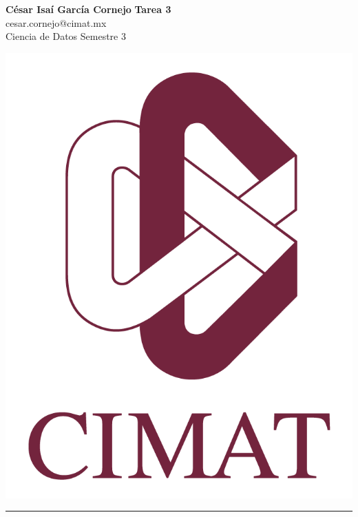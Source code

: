 \documentclass[a4paper, 11pt]{article}
\begin{document}
	\noindent
	
	\begin{minipage}[b][1.2cm][t]{0.8\textwidth}
		\large\textbf{César Isaí García Cornejo} \hfill \textbf{Tarea 3}  \\
		cesar.cornejo@cimat.mx \hfill \\
		\normalsize Ciencia de Datos \hfill Semestre 3\\
	\end{minipage}
	
	\hspace{14.4cm}
	\begin{minipage}[b][0.03cm][t]{0.12\linewidth}
		
		\vspace{-2.2cm}
		\includegraphics[scale=0.3]{Images/EscudoCimat.png}
	\end{minipage}
	
	\noindent\rule{7in}{2.8pt}
	
\end{document}
